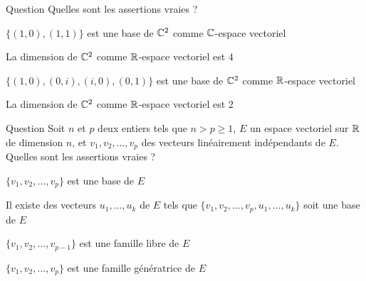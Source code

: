 \begin{multi}[multiple,feedback=
{L'espace \(\Cc^2\) est un \(\Cc\)-espace vectoriel de dimension \(2\). Par conséquent, pour tous \((a,b), (c,d) \in \Cc^2\), non colinéaires sur \(\Cc\), \(\{(a,b), (c,d)\}\) est une \(\Cc\)-base de \(\Cc^2\).
\vskip2mm
D'autre part \(\Cc^2\) est un  \(\Rr\)-espace vectoriel de dimension \(4\). Par conséquent, toute famille \(\{(a,b), (a',b'), (c,d), (c',d')\}\), de vecteurs de \(\Cc^2\) linéairement indépendants sur \(\Rr\), est une \(\Rr\)-base de \(\Cc^2\).
}]{Question}
Quelles sont les assertions vraies ?

    \item* \(\{(1,0),(1,1)\}\) est une base de \(\Cc^2\) comme \(\Cc\)-espace vectoriel
    \item* La dimension de \(\Cc^2\) comme \(\Rr\)-espace vectoriel est \(4\)
    \item* \(\{(1,0),(0,i),(i,0),(0,1)\}\) est une base de \(\Cc^2\) comme \(\Rr\)-espace vectoriel
    \item La dimension de \(\Cc^2\) comme \(\Rr\)-espace vectoriel est \(2\)
\end{multi}


\begin{multi}[multiple,feedback=
{Comme \(\dim E=n\) et \(n>p\), \(\{v_1,v_2, \dots, v_p\}\) n'est pas une famille génératrice de \(E\). Puisque cette famille est libre, d'après le théorème de la base incomplète, on peut la compléter pour avoir une base de \(E\).
\vskip2mm
D'autre part, \(\{v_1,v_2, \dots, v_{p-1}\}\) est libre, puisque toute famille extraite d'une famille libre est libre.
}]{Question}
Soit \(n\) et \(p\) deux entiers  tels que \(n >p \ge 1\), \(E\) un espace vectoriel sur \(\Rr\) de dimension \(n\), et \(v_1,v_2, \dots, v_p\) des vecteurs linéairement indépendants de \(E\). Quelles sont les assertions vraies ?

    \item \(\{v_1,v_2, \dots, v_p\}\) est une base de \(E\)
    \item* Il existe des vecteurs \(u_1, \dots , u_k\) de \(E\) tels que \(\{v_1,v_2, \dots, v_p, u_1, \dots , u_k\}\) soit une base de \(E\)
    \item* \(\{v_1,v_2, \dots, v_{p-1}\}\) est une famille libre de \(E\)
    \item \(\{v_1,v_2, \dots, v_{p}\}\) est une famille génératrice de \(E\)
\end{multi}


